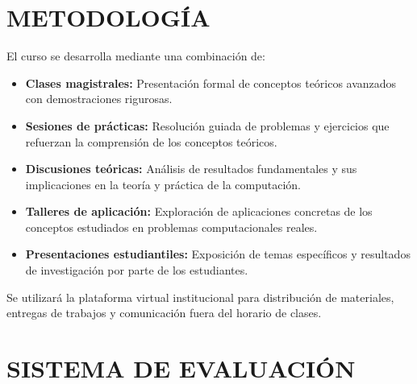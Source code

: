 \documentclass[12pt,a4paper]{article}
\begin{document}
\section{METODOLOGÍA}
\begin{tcolorbox}[colback=pucpGris!5,colframe=pucpGris,title=\textbf{Enfoque Metodológico}]
El curso se desarrolla mediante una combinación de:

\begin{itemize}[leftmargin=*]
    \item \textbf{Clases magistrales:} Presentación formal de conceptos teóricos avanzados con demostraciones rigurosas.
    \item \textbf{Sesiones de prácticas:} Resolución guiada de problemas y ejercicios que refuerzan la comprensión de los conceptos teóricos.
    \item \textbf{Discusiones teóricas:} Análisis de resultados fundamentales y sus implicaciones en la teoría y práctica de la computación.
    \item \textbf{Talleres de aplicación:} Exploración de aplicaciones concretas de los conceptos estudiados en problemas computacionales reales.
    \item \textbf{Presentaciones estudiantiles:} Exposición de temas específicos y resultados de investigación por parte de los estudiantes.
\end{itemize}

\begin{center}
\end{center}

Se utilizará la plataforma virtual institucional para distribución de materiales, entregas de trabajos y comunicación fuera del horario de clases.
\end{tcolorbox}
\vspace{0.5cm}

\section{SISTEMA DE EVALUACIÓN}
\end{document}
